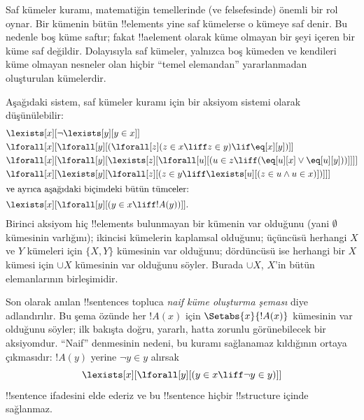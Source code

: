 \documentclass[../../../include/open-logic-section]{subfiles}
\begin{document}
\begin{ex}
Saf kümeler kuramı, matematiğin temellerinde (ve felsefesinde) önemli
bir rol oynar. Bir kümenin bütün !!{element}s yine saf kümelerse o
kümeye saf denir. Bu nedenle boş küme saftır; fakat !!a{element}
olarak küme olmayan bir şeyi içeren bir küme saf değildir. Dolayısıyla
saf kümeler, yalnızca boş kümeden ve kendileri küme olmayan nesneler
olan hiçbir ``temel elemandan'' yararlanmadan oluşturulan kümelerdir.

Aşağıdaki sistem, saf kümeler kuramı için bir aksiyom sistemi olarak
düşünülebilir:
\begin{align*}
& \lexists[x][\lnot \lexists[y][y \in x]]\\
& \lforall[x][\lforall[y][(\lforall[z](z \in x \liff z \in y) \lif
\eq[x][y])]]\\
& \lforall[x][\lforall[y][\lexists[z][\lforall[u][(u \in z \liff
(\eq[u][x] \lor \eq[u][y]))]]]]\\
& \lforall[x][\lexists[y][\lforall[z][(z \in y \liff \lexists[u][(z \in
        u \land u \in x)])]]]\\
\intertext{ve ayrıca aşağıdaki biçimdeki bütün tümceler:} &
\lexists[x][\lforall[y][(y \in x \liff !A(y))]].
\end{align*}
Birinci aksiyom hiç !!{element}s bulunmayan bir kümenin var olduğunu
(yani $\emptyset$ kümesinin varlığını); ikincisi kümelerin kaplamsal
olduğunu; üçüncüsü herhangi $X$ ve $Y$ kümeleri için $\{X,Y\}$
kümesinin var olduğunu; dördüncüsü ise herhangi bir $X$ kümesi için
$\cup X$ kümesinin var olduğunu söyler. Burada $\cup X$, $X$'in bütün
elemanlarının birleşimidir.

Son olarak anılan !!{sentence}s topluca \emph{naif küme oluşturma
şeması} diye adlandırılır. Bu şema özünde her $!A(x)$ için
$\Setabs{x}{!A(x)}$ kümesinin var olduğunu söyler; ilk bakışta doğru,
yararlı, hatta zorunlu görünebilecek bir aksiyomdur. ``Naif'' denmesinin
nedeni, bu kuramı sağlanamaz kıldığının ortaya çıkmasıdır: $!A(y)$
yerine $\lnot y\in y$ alırsak
\[
\lexists[x][\lforall[y][(y \in x \liff \lnot y \in y)]]
\]
!!{sentence} ifadesini elde ederiz ve bu !!{sentence} hiçbir
!!{structure} içinde sağlanmaz.
\end{ex}
\end{document}
